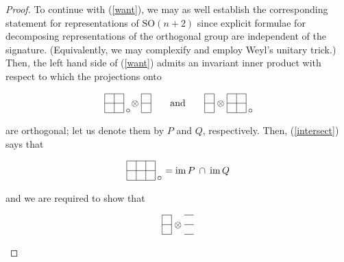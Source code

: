 \documentclass[a4paper,12pt]{amsart}
\newcommand{\im}{\operatorname{\mathrm{im}}}
\begin{document}
\begin{proof}
To continue with (\ref{want}), we may as well establish the corresponding
statement for representations of ${\mathrm{SO}}(n+2)$ since explicit formulae
for decomposing representations of the orthogonal group are independent of the
signature. (Equivalently, we may complexify and employ Weyl's unitary trick.)
Then, the left hand side of (\ref{want}) admits an invariant inner product
with respect to which the projections onto
$$\begin{picture}(25,30)
\put(0,5){\line(1,0){20}}
\put(0,15){\line(1,0){20}}
\put(0,25){\line(1,0){20}}
\put(0,5){\line(0,1){20}}
\put(10,5){\line(0,1){20}}
\put(20,5){\line(0,1){20}}
\put(22,7){\makebox(0,0)[l]{$\circ$}}
\end{picture}
\raisebox{12pt}{$\;\otimes\;$}
\begin{picture}(10,30)
\put(0,5){\line(1,0){10}}
\put(0,15){\line(1,0){10}}
\put(0,25){\line(1,0){10}}
\put(0,5){\line(0,1){20}}
\put(10,5){\line(0,1){20}}
\end{picture}\raisebox{12pt}{\qquad and\qquad}
\begin{picture}(10,30)
\put(0,5){\line(1,0){10}}
\put(0,15){\line(1,0){10}}
\put(0,25){\line(1,0){10}}
\put(0,5){\line(0,1){20}}
\put(10,5){\line(0,1){20}}
\end{picture}
\raisebox{12pt}{$\;\otimes\;$}
\begin{picture}(25,30)
\put(0,5){\line(1,0){20}}
\put(0,15){\line(1,0){20}}
\put(0,25){\line(1,0){20}}
\put(0,5){\line(0,1){20}}
\put(10,5){\line(0,1){20}}
\put(20,5){\line(0,1){20}}
\put(22,7){\makebox(0,0)[l]{$\circ$}}
\end{picture}$$
are orthogonal; let us denote them by $P$ and $Q$, respectively. Then,
(\ref{intersect}) says that
$$\begin{picture}(35,30)
\put(0,5){\line(1,0){30}}
\put(0,15){\line(1,0){30}}
\put(0,25){\line(1,0){30}}
\put(0,5){\line(0,1){20}}
\put(10,5){\line(0,1){20}}
\put(20,5){\line(0,1){20}}
\put(30,5){\line(0,1){20}}
\put(32,7){\makebox(0,0)[l]{$\circ$}}
\end{picture}
\raisebox{12pt}{$\;\;=\im P\:\cap\:\im Q$}$$
and we are required to show that
$$\begin{picture}(10,30)
\put(0,5){\line(1,0){10}}
\put(0,15){\line(1,0){10}}
\put(0,25){\line(1,0){10}}
\put(0,5){\line(0,1){20}}
\put(10,5){\line(0,1){20}}
\end{picture}
\raisebox{12pt}{$\;\otimes\;$}
\begin{picture}(10,30)
\put(0,5){\line(1,0){10}}
\put(0,15){\line(1,0){10}}
\put(0,25){\line(1,0){10}}

\end{picture}$$
\end{proof}
\end{document}
